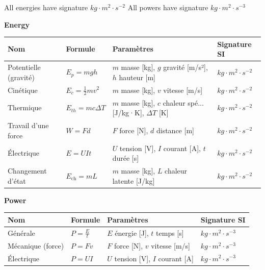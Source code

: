 \documentclass[11pt,a4paper]{article}
\newcommand{\theorybox}[2]{
\begin{tcolorbox}[title=\textbf{#1}]
#2
\end{tcolorbox}
}
\begin{document}
\theorybox{J - Common energy and power formulas}{
All energies have signature $kg \cdot m^2 \cdot s^{-2}$  
All powers have signature $kg \cdot m^2 \cdot s^{-3}$


\textbf{Energy}

\begin{center}
\begin{tabular}{|>{\small}l|>{\small}l|>{\small}l|>{\small}l|}
\hline
\textbf{Nom} & \textbf{Formule} & \textbf{Paramètres} & \textbf{Signature SI} \\
\hline
Potentielle (gravité) & $E_p = m g h$ & $m$ masse [kg], $g$ gravité [m/s²], $h$ hauteur [m] & $kg \cdot m^2 \cdot s^{-2}$ \\
\hline
Cinétique & $E_c = \frac{1}{2} m v^2$ & $m$ masse [kg], $v$ vitesse [m/s] & $kg \cdot m^2 \cdot s^{-2}$ \\
\hline
Thermique & $E_{th} = m c \Delta T$ & $m$ masse [kg], $c$ chaleur spé... [J/kg·K], $\Delta T$ [K] & $kg \cdot m^2 \cdot s^{-2}$ \\
\hline
Travail d'une force & $W = F d$ & $F$ force [N], $d$ distance [m] & $kg \cdot m^2 \cdot s^{-2}$ \\
\hline
Électrique & $E = U I t$ & $U$ tension [V], $I$ courant [A], $t$ durée [s] & $kg \cdot m^2 \cdot s^{-2}$ \\
\hline
Changement d'état & $E_\text{ch} = m L$ & $m$ masse [kg], $L$ chaleur latente [J/kg] & $kg \cdot m^2 \cdot s^{-2}$ \\
\hline
\end{tabular}
\end{center}

\vspace{0.3cm}

\textbf{Power}

\begin{center}
\begin{tabular}{|l|l|l|l|}
\hline
\textbf{Nom} & \textbf{Formule} & \textbf{Paramètres} & \textbf{Signature SI} \\
\hline
Générale & $P = \frac{E}{t}$ & $E$ énergie [J], $t$ temps [s] & $kg \cdot m^2 \cdot s^{-3}$ \\
\hline
Mécanique (force) & $P = F v$ & $F$ force [N], $v$ vitesse [m/s] & $kg \cdot m^2 \cdot s^{-3}$ \\
\hline
Électrique & $P = U I$ & $U$ tension [V], $I$ courant [A] & $kg \cdot m^2 \cdot s^{-3}$ \\
\hline
\end{tabular}
\end{center}

}
\end{document}
